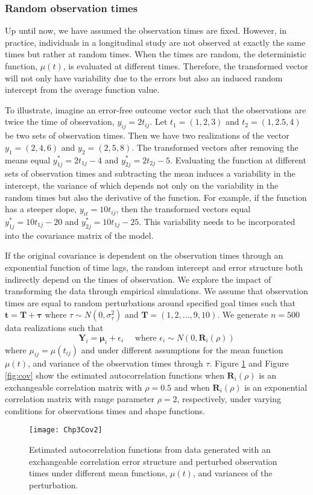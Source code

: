 \documentclass[12pt]{article}
\newcommand{\B}[0]{\mathbf}
\newcommand{\bs}[0]{\boldsymbol}
\begin{document}
\subsubsection{Random observation times} 
Up until now, we have assumed the observation times are fixed. However, in practice, individuals in a longitudinal study are not observed at exactly the same times but rather at random times. When the times are random, the deterministic function, $\mu(t)$, is evaluated at different times. Therefore, the transformed vector will not only have variability due to the errors but also an induced random intercept from the average function value. 

To illustrate, imagine an error-free outcome vector such that the observations are twice the time of observation, $y_{ij}=2t_{ij}$. Let $t_{1}=(1,2,3)$ and $t_{2}=(1,2.5,4)$ be two sets of observation times. Then we have two realizations of the vector $y_{1}=(2,4,6)$ and $y_{2}=(2,5,8)$. The transformed vectors after removing the means equal $y^{*}_{1j}=2t_{1j}-4$ and  $y^{*}_{2j}=2t_{2j}-5$. Evaluating the function at different sets of observation times and subtracting the mean induces a variability in the intercept, the variance of which depends not only on the variability in the random times but also the derivative of the function. For example, if the function has a steeper slope, $y_{it}=10t_{ij}$, then the transformed vectors equal $y^{*}_{1j} = 10t_{1j}-20$ and $y^{*}_{2j} = 10t_{1j}-25$. This variability needs to be incorporated into the covariance matrix of the model. 

If the original covariance is dependent on the observation times through an exponential function of time lags, the random intercept and error structure both indirectly depend on the times of observation. We explore the impact of transforming the data through empirical simulations. We assume that observation times are equal to random perturbations around specified goal times such that $\B t = \B T + \B \tau$ where $\tau\sim N(0,\sigma^{2}_{\tau})$ and $\B T = (1,2,...,9,10)$. We generate $n=500$ data realizations such that
$$\B Y_{i} = \bs\mu_{i} + \epsilon_{i}\quad\text{ where }\epsilon_{i}\sim N(0,\B R_{i}(\rho))$$
where $\mu_{ij}=\mu(t_{ij})$ and under different assumptions for the mean function $\mu(t)$, and variance of the observation times through $\tau$. Figure \ref{fig:cov1} and Figure \ref{fig:cov} show the estimated autocorrelation functions when $\B R_{i}(\rho)$ is an exchangeable correlation matrix with $\rho=0.5$ and when  $\B R_{i}(\rho)$ is an exponential correlation matrix with range parameter $\rho=2$, respectively, under varying conditions for observations times and shape functions.
\begin{figure}
\begin{center}
\texttt{[image: Chp3Cov2]}
\end{center}
\caption{Estimated autocorrelation functions from data generated with an exchangeable correlation error structure and perturbed observation times under different mean functions, $\mu(t)$, and variances of the perturbation.}
\label{fig:cov1}
\end{figure}
\end{document}
